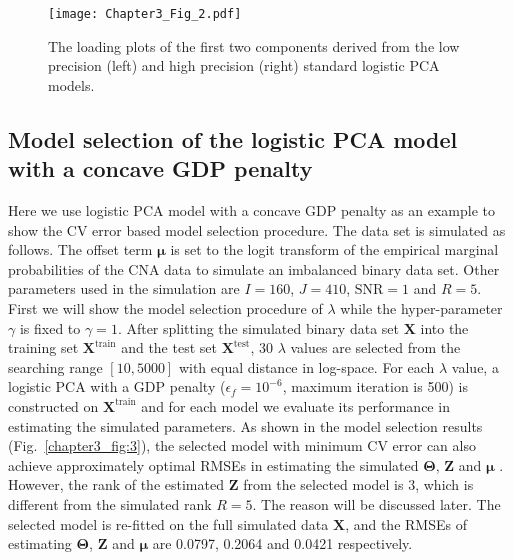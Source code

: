 \begin{figure}[htbp]
    \centering
    \texttt{[image: Chapter3\_Fig\_2.pdf]}
    \caption{The loading plots of the first two components derived from the low precision (left) and high precision (right) standard logistic PCA models.}
    \label{chapter3_fig:2}
\end{figure}

\subsection{Model selection of the logistic PCA model with a concave GDP penalty}
Here we use logistic PCA model with a concave GDP penalty as an example to show the CV error based model selection procedure. The data set is simulated as follows. The offset term $\bm{\mu}$ is set to the logit transform of the empirical marginal probabilities of the CNA data to simulate an imbalanced binary data set. Other parameters used in the simulation are $I=160$, $J=410$, $\text{SNR}=1$ and $R=5$. First we will show the model selection procedure of $\lambda$ while the hyper-parameter $\gamma$ is fixed to $\gamma=1$. After splitting the simulated binary data set $\mathbf{X}$ into the training set $\mathbf{X}^{\text{train}}$ and the test set $\mathbf{X}^{\text{test}}$, 30 $\lambda$ values are selected from the searching range $[10,5000]$ with equal distance in log-space. For each $\lambda$ value, a logistic PCA with a GDP penalty ($\epsilon_f = 10^{-6}$, maximum iteration is 500) is constructed on $\mathbf{X}^{\text{train}}$ and for each model we evaluate its performance in estimating the simulated parameters. As shown in the model selection results (Fig.~\ref{chapter3_fig:3}), the selected model with minimum CV error can also achieve approximately optimal RMSEs in estimating the simulated $\mathbf{\Theta}$, $\mathbf{Z}$ and $\bm{\mu}$ . However, the rank of the estimated $\mathbf{Z}$ from the selected model is 3, which is different from the simulated rank $R=5$. The reason will be discussed later. The selected model is re-fitted on the full simulated data $\mathbf{X}$, and the RMSEs of estimating $\mathbf{\Theta}$, $\mathbf{Z}$ and $\bm{\mu}$ are 0.0797, 0.2064 and 0.0421 respectively.

